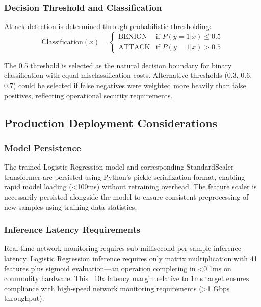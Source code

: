 \documentclass[conference]{IEEEtran}
\begin{document}
\subsubsection{Decision Threshold and Classification}

Attack detection is determined through probabilistic thresholding:
\begin{equation}
\text{Classification}(x) = \begin{cases}
\text{BENIGN} & \text{if } P(y=1|x) \leq 0.5 \\
\text{ATTACK} & \text{if } P(y=1|x) > 0.5
\end{cases}
\end{equation}

The 0.5 threshold is selected as the natural decision boundary for binary classification with equal misclassification costs. Alternative thresholds (0.3, 0.6, 0.7) could be selected if false negatives were weighted more heavily than false positives, reflecting operational security requirements.

\subsection{Production Deployment Considerations}

\subsubsection{Model Persistence}

The trained Logistic Regression model and corresponding StandardScaler transformer are persisted using Python's pickle serialization format, enabling rapid model loading (<100ms) without retraining overhead. The feature scaler is necessarily persisted alongside the model to ensure consistent preprocessing of new samples using training data statistics.

\subsubsection{Inference Latency Requirements}

Real-time network monitoring requires sub-millisecond per-sample inference latency. Logistic Regression inference requires only matrix multiplication with 41 features plus sigmoid evaluation—an operation completing in <0.1ms on commodity hardware. This ~10x latency margin relative to 1ms target ensures compliance with high-speed network monitoring requirements (>1 Gbps throughput).
\end{document}
